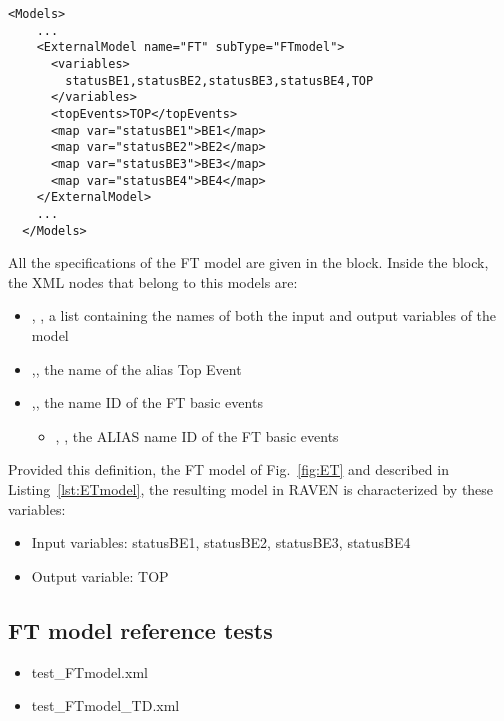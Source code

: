 \begin{lstlisting}[style=XML,morekeywords={anAttribute},caption=FTmodel input example., label=lst:FT_InputExample]
  <Models> 
    ...
    <ExternalModel name="FT" subType="FTmodel">
      <variables>
        statusBE1,statusBE2,statusBE3,statusBE4,TOP
      </variables>
      <topEvents>TOP</topEvents>
      <map var="statusBE1">BE1</map>
      <map var="statusBE2">BE2</map>
      <map var="statusBE3">BE3</map>
      <map var="statusBE4">BE4</map>
    </ExternalModel>
    ...
  </Models>
\end{lstlisting}

All the specifications of the FT model are given in the 
 block. 
Inside the  block, the XML
nodes that belong to this models are:
\begin{itemize}
  \item  {}, , a list containing the names of both the input and output variables of the model
  \item  {},, the name of the alias Top Event
  \item  {},, the name ID of the FT basic events
	  \begin{itemize}
	    \item {}, , the ALIAS name ID of the FT basic events
	  \end{itemize}
\end{itemize}

Provided this definition, the FT model of Fig.~\ref{fig:ET} and described in Listing~\ref{lst:ETmodel}, 
the resulting model in RAVEN is characterized by these variables:
\begin{itemize}
	\item Input variables: statusBE1, statusBE2, statusBE3, statusBE4
	\item Output variable: TOP
\end{itemize}

\subsection{FT model reference tests}
\begin{itemize}
	\item test\_FTmodel.xml
	\item test\_FTmodel\_TD.xml
\end{itemize}